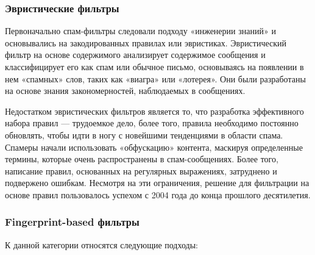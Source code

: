 \subsubsection{Эвристические фильтры}
Первоначально спам-фильтры следовали подходу «инженерии знаний» и основывались
на закодированных правилах или эвристиках. Эвристический фильтр на основе содержимого анализирует содержимое сообщения
и классифицирует его как спам или обычное письмо, основываясь на появлении в нем «спамных» слов, таких
как «виагра» или «лотерея». Они были разработаны на основе знания закономерностей, наблюдаемых в
сообщениях.

Недостатком эвристических фильтров является то, что разработка эффективного набора правил — трудоемкое
дело, более того, правила необходимо постоянно обновлять, чтобы идти в ногу с новейшими тенденциями в
области спама. Спамеры начали использовать «обфускацию» контента, маскируя определенные термины,
которые очень распространены в спам-сообщениях. Более того, написание правил, основанных на регулярных
выражениях, затруднено и подвержено ошибкам. Несмотря на эти ограничения, решение для фильтрации на
основе правил пользовалось успехом с 2004 года до конца прошлого десятилетия.

\subsubsection{Fingerprint-based фильтры}
К данной категории относятся следующие подходы:

